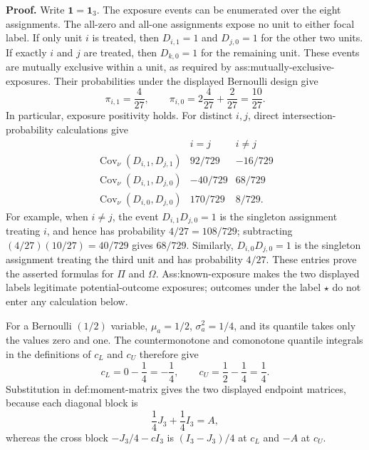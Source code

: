 \textbf{Proof.}
Write \(\mathbf 1=\mathbf 1_3\).  The exposure events can be enumerated over the eight assignments.  The all-zero and all-one assignments expose no unit to either focal label.  If only unit \(i\) is treated, then \(D_{i,1}=1\) and \(D_{j,0}=1\) for the other two units.  If exactly \(i\) and \(j\) are treated, then \(D_{k,0}=1\) for the remaining unit.  These events are mutually exclusive within a unit, as required by ass:mutually-exclusive-exposures.  Their probabilities under the displayed Bernoulli design give
\[
 \pi_{i,1}=\frac{4}{27},
 \qquad
 \pi_{i,0}=2\frac{4}{27}+\frac{2}{27}=\frac{10}{27}.
\]
In particular, exposure positivity holds.  For distinct \(i,j\), direct intersection-probability calculations give
\[
 \begin{array}{c|cc}
 &i=j&i\ne j\\ \hline
 \operatorname{Cov}_{\nu}(D_{i,1},D_{j,1})&92/729&-16/729\\
 \operatorname{Cov}_{\nu}(D_{i,1},D_{j,0})&-40/729&68/729\\
 \operatorname{Cov}_{\nu}(D_{i,0},D_{j,0})&170/729&8/729.
 \end{array}
\]
For example, when \(i\ne j\), the event \(D_{i,1}D_{j,0}=1\) is the singleton assignment treating \(i\), and hence has probability \(4/27=108/729\); subtracting \((4/27)(10/27)=40/729\) gives \(68/729\).  Similarly, \(D_{i,0}D_{j,0}=1\) is the singleton assignment treating the third unit and has probability \(4/27\).  These entries prove the asserted formulas for \(\Pi\) and \(\Omega\).  Ass:known-exposure makes the two displayed labels legitimate potential-outcome exposures; outcomes under the label \(\star\) do not enter any calculation below.

For a Bernoulli \((1/2)\) variable, \(\mu_a=1/2\), \(\sigma_a^2=1/4\), and its quantile takes only the values zero and one.  The countermonotone and comonotone quantile integrals in the definitions of \(c_L\) and \(c_U\) therefore give
\[
 c_L=0-\frac14=-\frac14,
 \qquad
 c_U=\frac12-\frac14=\frac14.
\]
Substitution in def:moment-matrix gives the two displayed endpoint matrices, because each diagonal block is
\[
 \frac14J_3+\frac14I_3=A,
\]
whereas the cross block \(-J_3/4-cI_3\) is \((I_3-J_3)/4\) at \(c_L\) and \(-A\) at \(c_U\).

